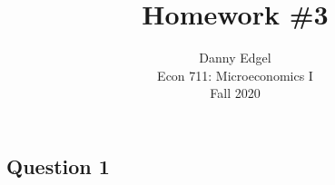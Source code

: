 \documentclass{article}
\begin{document}
\title{	Homework \#3 }
\author{ 	Danny Edgel 					\\ 
			Econ 711: Microeconomics I		\\
			Fall 2020						\\
		}
\maketitle\thispagestyle{empty}



\subsection*{Question 1}
\end{document}

